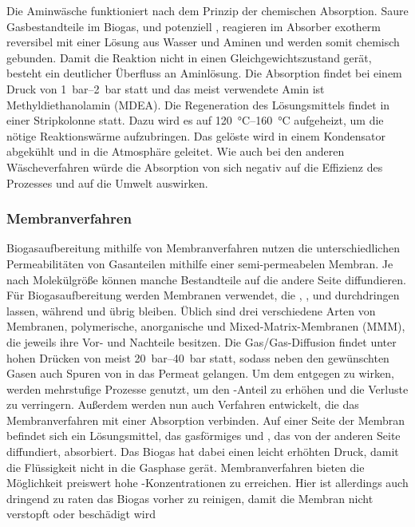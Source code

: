 Die Aminwäsche funktioniert nach dem Prinzip der chemischen Absorption. Saure Gasbestandteile im Biogas,  und potenziell , reagieren im Absorber exotherm reversibel mit einer Lösung aus Wasser und Aminen und werden somit chemisch gebunden. Damit die Reaktion nicht in einen Gleichgewichtszustand gerät, besteht ein deutlicher Überfluss an Aminlösung. Die Absorption findet bei einem Druck von \SIrange{1}{2}{\bar} statt und das meist verwendete Amin ist Methyldiethanolamin (MDEA). Die Regeneration des Lösungsmittels findet in einer Stripkolonne statt. Dazu wird es auf \SIrange{120}{160}{\degreeCelsius} aufgeheizt, um die nötige Reaktionswärme aufzubringen. Das gelöste  wird in einem Kondensator abgekühlt und in die Atmosphäre geleitet. Wie auch bei den anderen Wäscheverfahren würde die Absorption von  sich negativ auf die Effizienz des Prozesses und auf die Umwelt auswirken. \parencite{BHPT13} \parencite{KGKK2019} 


\subsubsection{Membranverfahren}\label{chap:membrane} 

Biogasaufbereitung mithilfe von Membranverfahren nutzen die unterschiedlichen Permeabilitäten von Gasanteilen mithilfe einer semi-permeabelen Membran. Je nach Molekülgröße können manche Bestandteile auf die andere Seite diffundieren. Für Biogasaufbereitung werden Membranen verwendet, die , ,  und  durchdringen lassen, während  und  übrig bleiben. Üblich sind drei verschiedene Arten von Membranen, polymerische, anorganische und Mixed-Matrix-Membranen (MMM), die jeweils ihre Vor- und Nachteile besitzen. Die Gas/Gas-Diffusion findet unter hohen Drücken von meist \SIrange{20}{40}{\bar} statt, sodass neben den gewünschten Gasen auch Spuren von  in das Permeat gelangen. Um dem entgegen zu wirken, werden mehrstufige Prozesse genutzt, um den -Anteil zu erhöhen und die Verluste zu verringern. Außerdem werden nun auch Verfahren entwickelt, die das Membranverfahren mit einer Absorption verbinden. Auf einer Seite der Membran befindet sich ein Lösungsmittel, das gasförmiges  und , das von der anderen Seite diffundiert, absorbiert. Das Biogas hat dabei einen leicht erhöhten Druck, damit die Flüssigkeit nicht in die Gasphase gerät. Membranverfahren bieten die Möglichkeit preiswert hohe -Konzentrationen zu erreichen. Hier ist allerdings auch dringend zu raten das Biogas vorher zu reinigen, damit die Membran nicht verstopft oder beschädigt wird     \parencite{KGKK2019} 


